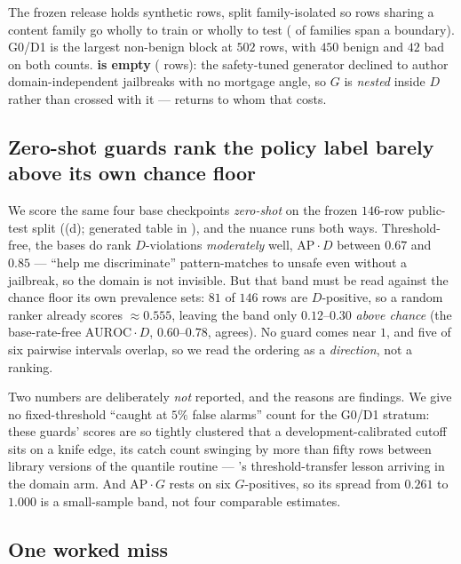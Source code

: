 \documentclass[manuscript,screen,review,anonymous]{acmart}
\begin{document}
The frozen release holds \MortNRows{} synthetic rows, split family-isolated so rows sharing a content
family go wholly to train or wholly to test (\MortNContentFamiliesSpanning{} of
\MortNContentFamilies{} families span a boundary). G0/D1 is the largest non-benign block at $502$ rows,
with $450$ benign and $42$ bad on both counts. \textbf{\MortEmptyQuadrant{} is empty}
(\MortNEmptyQuadrantRows{} rows): the safety-tuned generator declined to author domain-independent
jailbreaks with no mortgage angle, so $G$ is \emph{nested} inside $D$ rather than crossed with it ---
 returns to whom that costs.

\subsection{Zero-shot guards rank the policy label barely above its own chance floor}
\label{sec:mortgage-results}

We score the same four base checkpoints \emph{zero-shot} on the frozen $146$-row public-test split
((d); generated table in ), and the nuance runs both ways.
Threshold-free, the bases do rank $D$-violations \emph{moderately} well, $\mathrm{AP}\!\cdot\!D$ between
$0.67$ and $0.85$ --- ``help me discriminate'' pattern-matches to unsafe even without a jailbreak, so the
domain is not invisible. But that band must be read against the chance floor its own prevalence sets:
$81$ of $146$ rows are $D$-positive, so a random ranker already scores $\approx\!0.555$, leaving the band
only $0.12$--$0.30$ \emph{above chance} (the base-rate-free $\mathrm{AUROC}\!\cdot\!D$, $0.60$--$0.78$,
agrees). No guard comes near $1$, and five of six pairwise intervals overlap, so we read the ordering as
a \emph{direction}, not a ranking.

Two numbers are deliberately \emph{not} reported, and the reasons are findings. We give no
fixed-threshold ``caught at $5\%$ false alarms'' count for the G0/D1 stratum: these guards' scores are so
tightly clustered that a development-calibrated cutoff sits on a knife edge, its catch count swinging by
more than fifty rows between library versions of the quantile routine --- 's
threshold-transfer lesson arriving in the domain arm. And $\mathrm{AP}\!\cdot\!G$ rests on six
$G$-positives, so its spread from $0.261$ to $1.000$ is a small-sample band, not four comparable
estimates.

\subsection{One worked miss}
\label{sec:mortgage-case}
\end{document}
